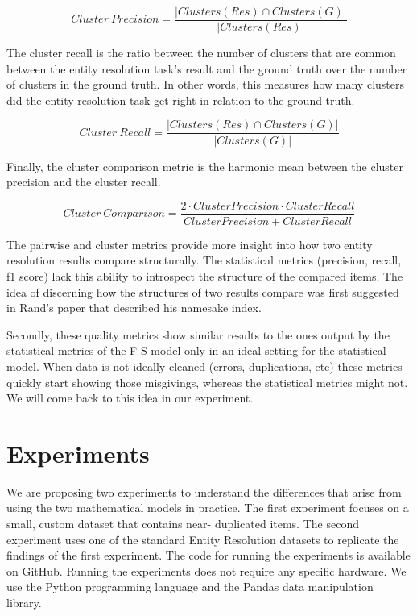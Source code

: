 \documentclass[lettersize,journal]{IEEEtran}
\begin{document}
    \[
        Cluster~Precision = \frac{|Clusters(Res) \cap Clusters(G)|}{
            |Clusters(Res)|
        }
    \]

    The cluster recall is the ratio between the number of clusters that are
    common between the entity resolution task's result and the ground truth over
    the number of clusters in the ground truth.
    In other words, this measures how many clusters did the entity resolution
    task get right in relation to the ground truth.

    \[
        Cluster~Recall = \frac{|Clusters(Res) \cap Clusters(G)|}{
            |Clusters(G)|
        }
    \]

    Finally, the cluster comparison metric is the harmonic mean between the
    cluster precision and the cluster recall.

    \[
        Cluster~Comparison = \frac{
            2 \cdot Cluster Precision \cdot Cluster Recall
        }{Cluster Precision + Cluster Recall}
    \]

    The pairwise and cluster metrics provide more insight into how two entity
    resolution results compare structurally.
    The statistical metrics (precision, recall, f1 score) lack this ability to
    introspect the structure of the compared items.
    The idea of discerning how the structures of two results compare was first
    suggested in Rand's paper that described his namesake index\cite{rand1971}.
    
    Secondly, these quality metrics show similar results to the ones output by
    the statistical metrics of the F-S model only in an ideal setting for the
    statistical model.
    When data is not ideally cleaned (errors, duplications, etc) these metrics
    quickly start showing those misgivings, whereas the statistical metrics
    might not.
    We will come back to this idea in our experiment.

    \section{Experiments}

    We are proposing two experiments to understand the differences that arise
    from using the two mathematical models in practice.
    The first experiment focuses on a small, custom dataset that contains near-
    duplicated items.
    The second experiment uses one of the standard Entity Resolution datasets
    to replicate the findings of the first experiment.
    The code for running the experiments is available on GitHub\cite{matchescu}.
    Running the experiments does not require any specific hardware.
    We use the Python\cite{python} programming language and the
    Pandas\cite{pandas2023} data manipulation library.
\end{document}
